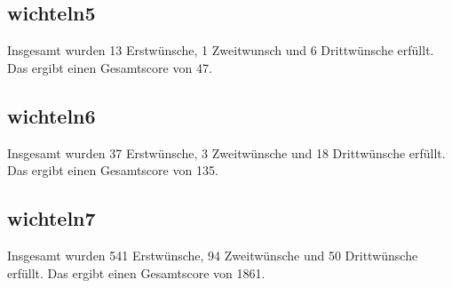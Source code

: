 \documentclass[a4paper, 12pt]{scrartcl}
\begin{document}
\subsection{wichteln5}
Insgesamt wurden 13 Erstwünsche, 1 Zweitwunsch und 6 Drittwünsche erfüllt. Das ergibt einen Gesamtscore von 47.

\subsection{wichteln6}
Insgesamt wurden 37 Erstwünsche, 3 Zweitwünsche und 18 Drittwünsche erfüllt. Das ergibt einen Gesamtscore von 135.

\subsection{wichteln7}
Insgesamt wurden 541 Erstwünsche, 94 Zweitwünsche und 50 Drittwünsche erfüllt. Das ergibt einen Gesamtscore von 1861.
\end{document}

